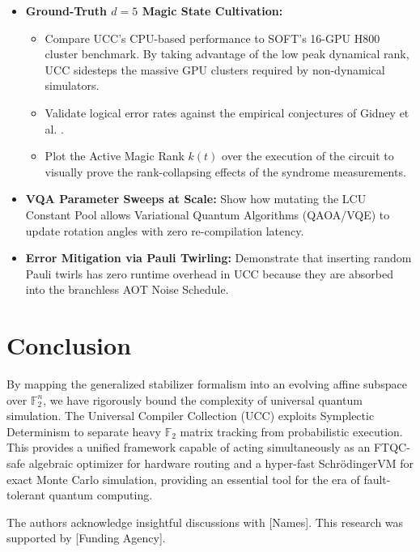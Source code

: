 \documentclass[aps,prx,reprint,superscriptaddress,nofootinbib]{revtex4-2}
\theoremstyle{definition}
\newcommand{\svm}{Schr\"odingerVM}
\begin{document}
\begin{itemize}[leftmargin=*]
    \item \textbf{Ground-Truth $d=5$ Magic State Cultivation:}
        \begin{itemize}
            \item Compare UCC's CPU-based performance to SOFT's 16-GPU H800 cluster benchmark. By taking advantage of the low peak dynamical rank, UCC sidesteps the massive GPU clusters required by non-dynamical simulators.
            \item Validate logical error rates against the empirical conjectures of Gidney et al. \cite{gidney2024magic}.
            \item Plot the Active Magic Rank $k(t)$ over the execution of the circuit to visually prove the rank-collapsing effects of the syndrome measurements.
        \end{itemize}
    \item \textbf{VQA Parameter Sweeps at Scale:} Show how mutating the LCU Constant Pool allows Variational Quantum Algorithms (QAOA/VQE) to update rotation angles with zero re-compilation latency.
    \item \textbf{Error Mitigation via Pauli Twirling:} Demonstrate that inserting random Pauli twirls has zero runtime overhead in UCC because they are absorbed into the branchless AOT Noise Schedule.
\end{itemize}

\section{Conclusion}
\label{sec:conclusion}

By mapping the generalized stabilizer formalism into an evolving affine subspace over $\mathbb{F}_2^n$, we have rigorously bound the complexity of universal quantum simulation. The Universal Compiler Collection (UCC) exploits Symplectic Determinism to separate heavy $\mathbb{F}_2$ matrix tracking from probabilistic execution. This provides a unified framework capable of acting simultaneously as an FTQC-safe algebraic optimizer for hardware routing and a hyper-fast \svm{} for exact Monte Carlo simulation, providing an essential tool for the era of fault-tolerant quantum computing.

\begin{acknowledgments}
The authors acknowledge insightful discussions with [Names]. This research was supported by [Funding Agency].
\end{acknowledgments}
\end{document}
